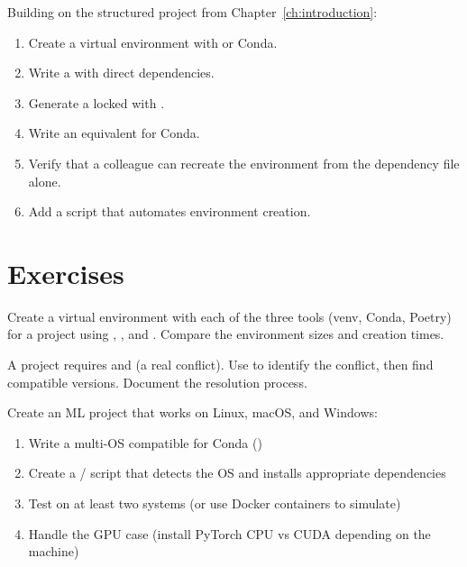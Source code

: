 \begin{miniproject}[title=\textbf{Mini-project 2: Setting up an environment}]
Building on the structured project from Chapter~\ref{ch:introduction}:
\begin{enumerate}
  \item Create a virtual environment with  or Conda.
  \item Write a  with direct dependencies.
  \item Generate a locked  with .
  \item Write an equivalent  for Conda.
  \item Verify that a colleague can recreate the environment from the
    dependency file alone.
  \item Add a  script that automates environment creation.
\end{enumerate}
\end{miniproject}

\section{Exercises}
\label{sec:exercises-ch2}

\begin{exercise}
Create a virtual environment with each of the three tools (venv, Conda,
Poetry) for a project using , , and .
Compare the environment sizes and creation times.
\end{exercise}

\begin{exercise}
A project requires  and  (a real
conflict). Use  to identify the conflict, then find
compatible versions. Document the resolution process.
\end{exercise}

\begin{exercise}
Create an ML project that works on Linux, macOS, and Windows:
\begin{enumerate}
  \item Write a multi-OS compatible  for Conda
    ()
  \item Create a  /  script that detects
    the OS and installs appropriate dependencies
  \item Test on at least two systems (or use Docker containers to simulate)
  \item Handle the GPU case (install PyTorch CPU vs CUDA depending on the
    machine)
\end{enumerate}
\end{exercise}

